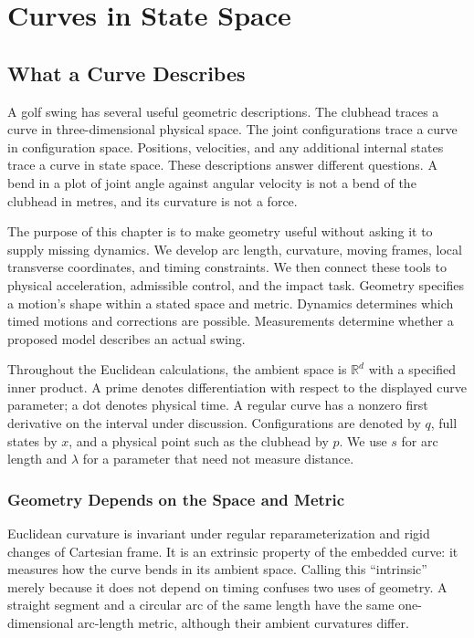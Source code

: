 \documentclass[12pt, openany]{book}
\theoremstyle{plain}
\begin{document}
\setcounter{chapter}{1}

\chapter{Curves in State Space}
\label{ch:curves_in_state_space}

\section{What a Curve Describes}

A golf swing has several useful geometric descriptions. The clubhead traces a
curve in three-dimensional physical space. The joint configurations trace a
curve in configuration space. Positions, velocities, and any additional
internal states trace a curve in state space. These descriptions answer
different questions. A bend in a plot of joint angle against angular velocity
is not a bend of the clubhead in metres, and its curvature is not a force.

The purpose of this chapter is to make geometry useful without asking it to
supply missing dynamics. We develop arc length, curvature, moving frames,
local transverse coordinates, and timing constraints. We then connect these
tools to physical acceleration, admissible control, and the impact task.
Geometry specifies a motion's shape within a stated space and metric.
Dynamics determines which timed motions and corrections are possible.
Measurements determine whether a proposed model describes an actual swing.

Throughout the Euclidean calculations, the ambient space is $\mathbb R^d$
with a specified inner product. A prime denotes differentiation with respect
to the displayed curve parameter; a dot denotes physical time. A regular
curve has a nonzero first derivative on the interval under discussion.
Configurations are denoted by $q$, full states by $x$, and a physical point
such as the clubhead by $p$. We use $s$ for arc length and $\lambda$ for a
parameter that need not measure distance.

\subsection{Geometry Depends on the Space and Metric}

Euclidean curvature is invariant under regular reparameterization and rigid
changes of Cartesian frame. It is an extrinsic property of the embedded
curve: it measures how the curve bends in its ambient space. Calling this
``intrinsic'' merely because it does not depend on timing confuses two uses
of geometry. A straight segment and a circular arc of the same length have
the same one-dimensional arc-length metric, although their ambient
curvatures differ.
\end{document}
